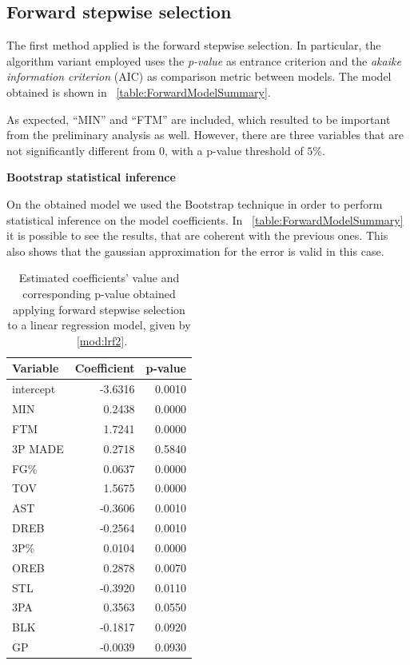 \subsection{Forward stepwise selection}

The first method applied is the forward stepwise selection. In particular, the algorithm variant employed uses the \textit{p-value} as entrance criterion and the \textit{akaike information criterion} (AIC) as comparison metric between models. The model obtained is shown in \Tab~\ref{table:ForwardModelSummary}.

As expected, ``MIN'' and ``FTM'' are included, which resulted to be important from the preliminary analysis as well. However, there are three variables that are not significantly different from 0, with a p-value threshold of $5\%$.

\vspace{0.2cm}
\noindent
\textbf{Bootstrap statistical inference}

On the obtained model we used the Bootstrap technique in order to perform statistical inference on the model coefficients. In \Tab~\ref{table:ForwardModelSummary} it is possible to see the results, that are coherent with the previous ones. This also shows that the gaussian approximation for the error is valid in this case. 

\begin{center}
\end{center}

\begin{table}[h]
	\centering
	\begin{tabular}{|| l | r | r ||} 
		\hline
		Variable & Coefficient & p-value \\
		\hline
		\hline
		intercept & -3.6316 & 0.0010 \\
		MIN & 0.2438 & 0.0000 \\
		FTM & 1.7241 & 0.0000 \\
		3P MADE & 0.2718 & 0.5840 \\
		FG\% & 0.0637 & 0.0000 \\
		TOV & 1.5675 & 0.0000 \\
		AST & -0.3606 & 0.0010 \\
		DREB & -0.2564 & 0.0010 \\
		3P\% & 0.0104 & 0.0000 \\
		OREB & 0.2878 & 0.0070 \\
		STL & -0.3920 & 0.0110 \\
		3PA & 0.3563 & 0.0550 \\
		BLK & -0.1817 & 0.0920 \\
		GP & -0.0039 & 0.0930 \\
		\hline
	\end{tabular}
	\caption{Estimated coefficients' value and corresponding p-value obtained applying forward stepwise selection to a linear regression model, given by \Mod~\ref{mod:lrf2}.}
	\label{table:BootForwardModel}
\end{table}

